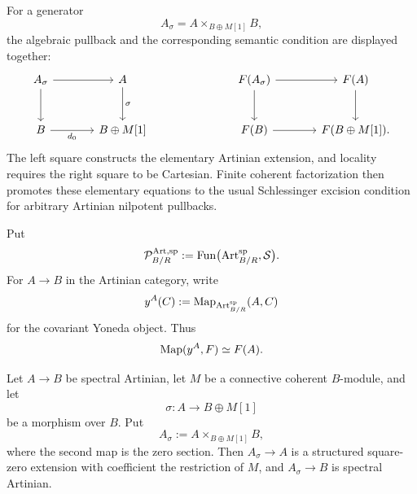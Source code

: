 For a generator
\[
    A_\sigma=A\times_{B\oplus M[1]}B,
\]
the algebraic pullback and the corresponding semantic condition are displayed together:
\[
\begin{tikzcd}[column sep=large,row sep=large]
    A_\sigma \arrow[r] \arrow[d]
        & A \arrow[d,"\sigma"]
    &&
    F(A_\sigma) \arrow[r] \arrow[d]
        & F(A) \arrow[d]
    \\
    B \arrow[r,"d_0"']
        & B\oplus M[1]
    &&
    F(B) \arrow[r]
        & F(B\oplus M[1]).
\end{tikzcd}
\]
The left square constructs the elementary Artinian extension, and locality requires the
right square to be Cartesian. Finite coherent factorization then promotes these
elementary equations to the usual Schlessinger excision condition for arbitrary Artinian
nilpotent pullbacks.

\begin{definition}
\label{def:artinian-semantics-category}
Put
\[
    \mathcal P^{\mathrm{Art},\mathrm{sp}}_{B/R}
    :=
    \operatorname{Fun}\bigl(
        \operatorname{Art}^{\mathrm{sp}}_{B/R},
        \mathcal S
    \bigr).
\]
For \(A\to B\) in the Artinian category, write
\[
    y^A(C):=
    \operatorname{Map}_{\operatorname{Art}^{\mathrm{sp}}_{B/R}}(A,C)
\]
for the covariant Yoneda object. Thus
\[
    \operatorname{Map}(y^A,F)\simeq F(A).
\]
\end{definition}

\begin{lemma}
\label{lem:schlessinger-pullback-artinian}
Let \(A\to B\) be spectral Artinian, let \(M\) be a connective coherent
\(B\)-module, and let
\[
    \sigma:A\longrightarrow B\oplus M[1]
\]
be a morphism over \(B\). Put
\[
    A_\sigma:=A\times_{B\oplus M[1]}B,
\]
where the second map is the zero section. Then \(A_\sigma\to A\) is a
structured square-zero extension with coefficient the restriction of \(M\),
and \(A_\sigma\to B\) is spectral Artinian.
\end{lemma}

